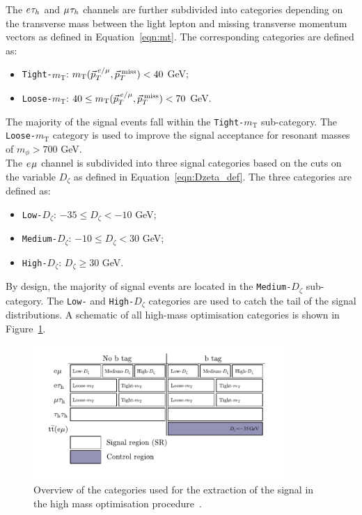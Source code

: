 The $e_{}\tau_{h}$ and $\mu_{}\tau_{h}$ channels are further subdivided into categories depending on the transverse mass between the light lepton and missing transverse momentum vectors as defined in Equation~\ref{eqn:mt}.
The corresponding categories are defined as:
\begin{itemize}
\item \texttt{Tight-$m_{\text{T}}$}: $m_{\text{T}}(\vec{p}_{T}^{\hspace{2pt}e/\mu},\vec{p}_{T}^{\hspace{2pt}\text{miss}}) < 40$ GeV;
\item \texttt{Loose-$m_{\text{T}}$}: $40 \leq m_{\text{T}}(\vec{p}_{T}^{\hspace{2pt}e/\mu},\vec{p}_{T}^{\hspace{2pt}\text{miss}}) < 70$ GeV.
\end{itemize}
The majority of the signal events fall within the \texttt{Tight-$m_{\text{T}}$} sub-category.
The \texttt{Loose-$m_{\text{T}}$} category is used to improve the signal acceptance for resonant masses of $m_{\phi} > 700$ GeV.\\

The $e_{}\mu_{}$ channel is subdivided into three signal categories based on the cuts on the variable $D_{\zeta}$ as defined in Equation~\ref{eqn:Dzeta_def}.
The three categories are defined as:
\begin{itemize}
\item \texttt{Low-$D_\zeta$}: $-35 \leq D_\zeta < -10$ GeV;
\item \texttt{Medium-$D_\zeta$}: $-10 \leq D_\zeta <  30$ GeV;
\item \texttt{High-$D_\zeta$}: $D_\zeta \geq 30$ GeV.
\end{itemize}
By design, the majority of signal events are located in the \texttt{Medium-$D_\zeta$} sub-category.
The \texttt{Low-} and \texttt{High-$D_\zeta$} categories are used to catch the tail of the signal distributions.
A schematic of all high-mass optimisation categories is shown in Figure~\ref{fig:high_mass_categories}. \\

\begin{figure}[!hbtp]
\centering
    \includegraphics[width=0.85\textwidth]{Figures/high_mass_categories.pdf}
\caption{Overview of the categories used for the extraction of the signal in the high mass optimisation procedure~\cite{CMS:2022rbd}.}
\label{fig:high_mass_categories}
\end{figure}

